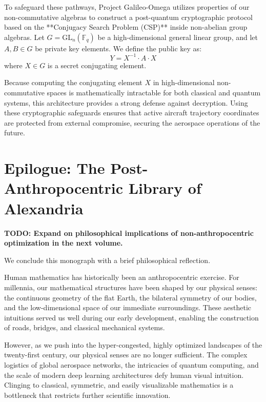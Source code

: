 \documentclass[11pt,a4paper]{book}
\newcommand{\todo}[1]{\textbf{TODO: #1}}
\begin{document}
To safeguard these pathways, Project Galileo-Omega utilizes properties of our non-commutative algebras to construct a post-quantum cryptographic protocol based on the **Conjugacy Search Problem (CSP)** inside non-abelian group algebras. Let $G = \text{GL}_n(\mathbb{F}_q)$ be a high-dimensional general linear group, and let $A, B \in G$ be private key elements. We define the public key as:
\begin{equation}
\label{eq:non_abelian_cryptosystem}
Y = X^{-1} \cdot A \cdot X
\end{equation}
where $X \in G$ is a secret conjugating element.

Because computing the conjugating element $X$ in high-dimensional non-commutative spaces is mathematically intractable for both classical and quantum systems, this architecture provides a strong defense against decryption. Using these cryptographic safeguards ensures that active aircraft trajectory coordinates are protected from external compromise, securing the aerospace operations of the future.

\section{Epilogue: The Post-Anthropocentric Library of Alexandria}\label{sec:ch10_epilogue}

\todo{Expand on philosophical implications of non-anthropocentric optimization in the next volume.}

We conclude this monograph with a brief philosophical reflection.

Human mathematics has historically been an anthropocentric exercise. For millennia, our mathematical structures have been shaped by our physical senses: the continuous geometry of the flat Earth, the bilateral symmetry of our bodies, and the low-dimensional space of our immediate surroundings. These aesthetic intuitions served us well during our early development, enabling the construction of roads, bridges, and classical mechanical systems.

However, as we push into the hyper-congested, highly optimized landscapes of the twenty-first century, our physical senses are no longer sufficient. The complex logistics of global aerospace networks, the intricacies of quantum computing, and the scale of modern deep learning architectures defy human visual intuition. Clinging to classical, symmetric, and easily visualizable mathematics is a bottleneck that restricts further scientific innovation.
\end{document}
